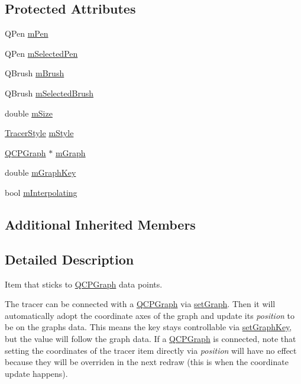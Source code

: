 \subsection*{Protected Attributes}
\begin{DoxyCompactItemize}
\item 
Q\+Pen \hyperlink{class_q_c_p_item_tracer_a579e3bd6bd16d6aaff03638dc8a99a69}{m\+Pen}
\item 
Q\+Pen \hyperlink{class_q_c_p_item_tracer_a3f61829784200819661d1e2a5354d866}{m\+Selected\+Pen}
\item 
Q\+Brush \hyperlink{class_q_c_p_item_tracer_a6597be63a17a266233941354200b2340}{m\+Brush}
\item 
Q\+Brush \hyperlink{class_q_c_p_item_tracer_a1c15d2adde40efdcc0ef1ff78fd256a6}{m\+Selected\+Brush}
\item 
double \hyperlink{class_q_c_p_item_tracer_a575153a24bb357d1e006f6bc3bd099b9}{m\+Size}
\item 
\hyperlink{class_q_c_p_item_tracer_a2f05ddb13978036f902ca3ab47076500}{Tracer\+Style} \hyperlink{class_q_c_p_item_tracer_afb1f236bebf417544e0138fef22a292e}{m\+Style}
\item 
\hyperlink{class_q_c_p_graph}{Q\+C\+P\+Graph} $\ast$ \hyperlink{class_q_c_p_item_tracer_a2d70cf616b579563aa15f796dfc143ac}{m\+Graph}
\item 
double \hyperlink{class_q_c_p_item_tracer_a8fa20f2e9ee07d21fd7c8d30ba4702ca}{m\+Graph\+Key}
\item 
bool \hyperlink{class_q_c_p_item_tracer_afab37c22ad39f235921e86f93cd84595}{m\+Interpolating}
\end{DoxyCompactItemize}
\subsection*{Additional Inherited Members}


\subsection{Detailed Description}
Item that sticks to \hyperlink{class_q_c_p_graph}{Q\+C\+P\+Graph} data points. 

 The tracer can be connected with a \hyperlink{class_q_c_p_graph}{Q\+C\+P\+Graph} via \hyperlink{class_q_c_p_item_tracer_af5886f4ded8dd68cb4f3388f390790c0}{set\+Graph}. Then it will automatically adopt the coordinate axes of the graph and update its {\itshape position} to be on the graph\textquotesingle{}s data. This means the key stays controllable via \hyperlink{class_q_c_p_item_tracer_a6840143b42f3b685cedf7c6d83a704c8}{set\+Graph\+Key}, but the value will follow the graph data. If a \hyperlink{class_q_c_p_graph}{Q\+C\+P\+Graph} is connected, note that setting the coordinates of the tracer item directly via {\itshape position} will have no effect because they will be overriden in the next redraw (this is when the coordinate update happens).

